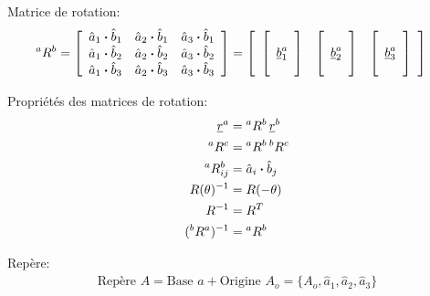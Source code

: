 Matrice de rotation:
\begin{align}
{}^aR^b &=
\left[ \begin{array}{c c c}
		   \hat{a}_1 \boldsymbol{\cdot} \hat{b}_1 & \hat{a}_2 \boldsymbol{\cdot} \hat{b}_1 & \hat{a}_3 \boldsymbol{\cdot} \hat{b}_1 \\
		   \hat{a}_1 \boldsymbol{\cdot} \hat{b}_2 & \hat{a}_2 \boldsymbol{\cdot} \hat{b}_2 & \hat{a}_3 \boldsymbol{\cdot} \hat{b}_2 \\
		   \hat{a}_1 \boldsymbol{\cdot} \hat{b}_3 & \hat{a}_2 \boldsymbol{\cdot} \hat{b}_3 & \hat{a}_3 \boldsymbol{\cdot} \hat{b}_3
\end{array} \right] =
\left[ \begin{array}{c c c}
		   \left[ \begin{array}{c} \\ \underline{b}_1^a \\  \\ \end{array}  \right] & \left[ \begin{array}{c} \\ \underline{b}_2^a \\  \\ \end{array}  \right] & \left[ \begin{array}{c} \\ \underline{b}_3^a \\  \\ \end{array}  \right]
\end{array} \right]
\end{align}

Propriétés des matrices de rotation:
\begin{align}
	\underline{r}^a &= {}^aR^b \, \underline{r}^b \\
	{}^aR^c &=  {}^aR^b \, {}^bR^c \\
	{}^aR^b_{ij} &= \hat{a}_i \boldsymbol{\cdot} \hat{b}_j \\
	R(\theta)^{-1} &= R(-\theta) \\
	R^{-1} &= R^T \\
	({}^bR^a)^{-1} &= {}^aR^b
\end{align}


Repère:
\begin{align}
	\text{Repère } A  = \text{Base } a + \text{Origine } A_o = \{ A_o , \hat{a}_{1} , \hat{a}_{2} , \hat{a}_{3} \}
\end{align}

